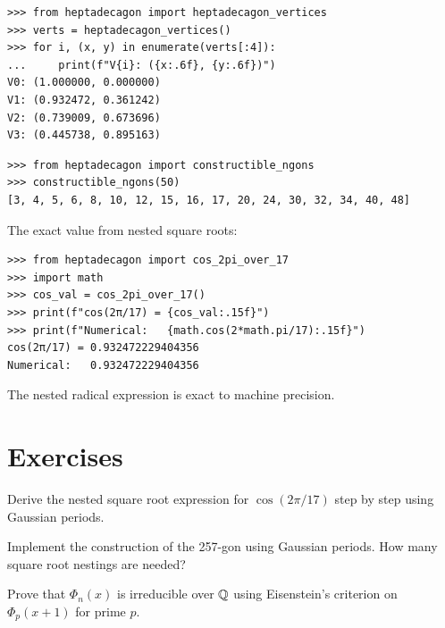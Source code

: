 \begin{example}
\begin{lstlisting}[style=python]
>>> from heptadecagon import heptadecagon_vertices
>>> verts = heptadecagon_vertices()
>>> for i, (x, y) in enumerate(verts[:4]):
...     print(f"V{i}: ({x:.6f}, {y:.6f})")
V0: (1.000000, 0.000000)
V1: (0.932472, 0.361242)
V2: (0.739009, 0.673696)
V3: (0.445738, 0.895163)
\end{lstlisting}
\end{example}

\begin{example}
\begin{lstlisting}[style=python]
>>> from heptadecagon import constructible_ngons
>>> constructible_ngons(50)
[3, 4, 5, 6, 8, 10, 12, 15, 16, 17, 20, 24, 30, 32, 34, 40, 48]
\end{lstlisting}
\end{example}

\begin{example}
The exact value from nested square roots:
\begin{lstlisting}[style=python]
>>> from heptadecagon import cos_2pi_over_17
>>> import math
>>> cos_val = cos_2pi_over_17()
>>> print(f"cos(2π/17) = {cos_val:.15f}")
>>> print(f"Numerical:   {math.cos(2*math.pi/17):.15f}")
cos(2π/17) = 0.932472229404356
Numerical:   0.932472229404356
\end{lstlisting}
The nested radical expression is exact to machine precision.
\end{example}

\section{Exercises}

\begin{exercise}
Derive the nested square root expression for $\cos(2\pi/17)$ step by step using Gaussian periods.
\end{exercise}

\begin{exercise}
Implement the construction of the 257-gon using Gaussian periods. How many square root nestings are needed?
\end{exercise}

\begin{exercise}
Prove that $\Phi_n(x)$ is irreducible over $\mathbb{Q}$ using Eisenstein's criterion  on $\Phi_p(x+1)$ for prime $p$.
\end{exercise}

